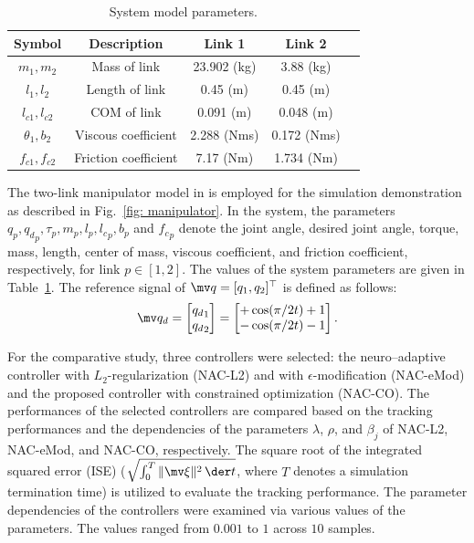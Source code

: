 \documentclass[letterpaper, 10 pt, conference]{ieeeconf}  %
\begin{document}
\begin{table}[!t]
    \renewcommand{\arraystretch}{1.3}
    \caption{System model parameters.}
    \centering
    \begin{tabular}{|c||c|c|c|c|}
    \hline
    Symbol & \textbf{Description} & \textbf{Link 1} & \textbf{Link 2} \\
    \hline 
    $m_1, m_2$ & Mass of link    & 23.902 (kg) & 3.88 (kg) \\
    \hline
    $l_1, l_2$  & Length of link   & 0.45 (m) & 0.45 (m) \\
    \hline
    $l_{c1}, l_{c2}$ & COM of link  & 0.091 (m) & 0.048 (m) \\
    \hline
    $\theta_1, b_2$   & Viscous coefficient  &  2.288 (Nms) & 0.172 (Nms) \\
    \hline
    $f_{c1}, f_{c2}$  & Friction coefficient &  7.17 (Nm) & 1.734 (Nm) \\
    \hline
    \end{tabular}
    \label{table: system parameters}
\end{table}

The two-link manipulator model in \cite{Markus:2013aa} is employed for the simulation demonstration as described in Fig.~\ref{fig: manipulator}.
In the system, the parameters $q_p,{q_d}_p,\tau_p,m_p,l_p,{l_c}_p,b_p$ and ${f_c}_p$ denote the joint angle, desired joint angle, torque, mass, length, center of mass, viscous coefficient, and friction coefficient, respectively, for link $p\in[1,2]$.
The values of the system parameters are given in Table~\ref{table: system parameters}.
The reference signal of $\mv q=[q_1,q_2]^\top $ is defined as follows:
\begin{equation}
    \mv q_d
    =
    \begin{bmatrix}
        {q_d}_1\\
        {q_d}_2
    \end{bmatrix}
    = 
    \begin{bmatrix}
        +\cos(\pi/2 t) + 1 \\
        -\cos(\pi/2 t) - 1 
    \end{bmatrix}
    .
\end{equation}

For the comparative study, three controllers were selected: the neuro–adaptive controller with $L_2$-regularization (NAC-L2) and with $\epsilon$-modification (NAC-eMod) and the proposed controller with constrained optimization (NAC-CO).
The performances of the selected controllers are compared based on the tracking performances and the dependencies of the parameters $\lambda$, $\rho$, and $\beta_j$ of NAC-L2, NAC-eMod, and NAC-CO, respectively.
The square root of the integrated squared error (ISE) (\ie $\sqrt{\int_0^T \Vert\mv \xi\Vert^2\,\der t}$, where $T$ denotes a simulation termination time) is utilized to evaluate the tracking performance.
The parameter dependencies of the controllers were examined via various values of the parameters. 
The values ranged from $0.001$ to $1$ across $10$ samples.
\end{document}
